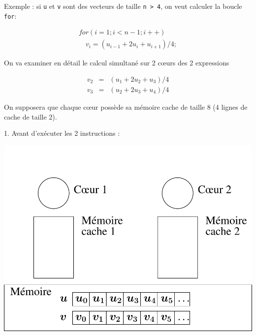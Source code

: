 \documentclass{beamer}
\begin{document}
\begin{frame}[fragile]
	Exemple : si \verb|u| et \verb|v| sont des vecteurs de taille \verb|n > 4|, on veut calculer la boucle {\tt for}:

	\begin{equation}
	\begin{array}{l}
for (i=1; i<n-1; i++) \\
\quad  v_i = (u_{i-1} + 2 u_{i} + u_{i+1})/4;
\end{array}
	\end{equation}


	On va examiner en détail le calcul simultané sur 2 c\oe urs des 2 expressions
	
	$$
	\begin{array}{lcl}
	v_2 & = & (u_1 + 2 u_2 + u_3)/4 \\[0.4cm]
	v_3 & = & (u_2 + 2 u_3 + u_4)/4
	\end{array}	
	$$
	
	On supposera que chaque c\oe ur possède sa mémoire cache de taille 8 (4 lignes de cache de taille 2).
\end{frame}

\begin{frame}
	\parbox[t][1cm]{10cm}{1. Avant d'exécuter les 2 instructions :}
   \begin{center}
   \includegraphics[scale=0.6]{../../Images/multithread0}
   \end{center}
\end{frame}
\end{document}
